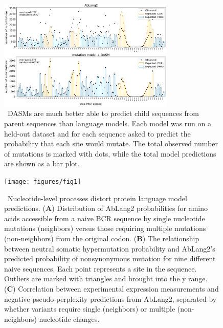 \documentclass{article}
\begin{document}
\begin{figure}[ht]
\centering
\centerline{\includegraphics[width=0.75\textwidth]{figures/sites-oe-rodriguez}}
\caption{\
DASMs are much better able to predict child sequences from parent sequences than language models.
Each model was run on a held-out dataset and for each sequence asked to predict the probability that each site would mutate.
The total observed number of mutations is marked with dots, while the total model predictions are shown as a bar plot.
}%
\label{fig:selFactorsAndPerplexity}
\end{figure}

\begin{figure}[h!]
\centering
\centerline{\texttt{[image: figures/fig1]}}
\caption{\
Nucleotide-level processes distort protein language model predictions.
(\textbf{A}) Distribution of AbLang2 probabilities for amino acids accessible from a naive BCR sequence by single nucleotide mutations (neighbors) versus those requiring multiple mutations (non-neighbors) from the original codon.
(\textbf{B}) The relationship between neutral somatic hypermutation probability and AbLang2's predicted probability of nonsynonymous mutation for nine different naive sequences. Each point represents a site in the sequence.
Outliers are marked with triangles and brought into the y range.
(\textbf{C}) Correlation between experimental expression measurements and negative pseudo-perplexity predictions from AbLang2, separated by whether variants require single (neighbors) or multiple (non-neighbors) nucleotide changes.
}%
\label{fig:ntProcessInLLMs}
\end{figure}
\end{document}
